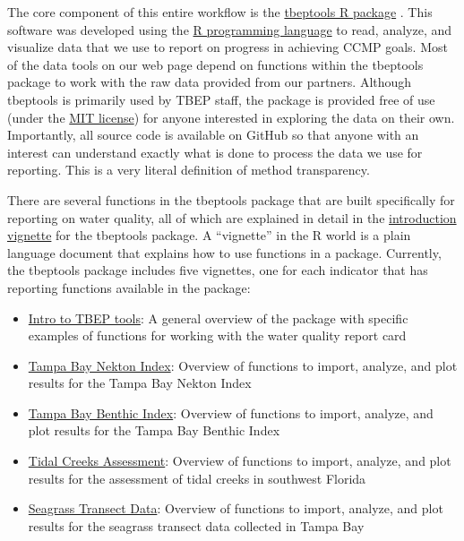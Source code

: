 \documentclass[
]{book}
\providecommand{\tightlist}{%
  \setlength{\itemsep}{0pt}\setlength{\parskip}{0pt}}
\begin{document}
The core component of this entire workflow is the \href{https://tbep-tech.github.io/tbeptools/}{tbeptools R package} \citep{Beck21}. This software was developed using the \href{https://cran.r-project.org/}{R programming language} to read, analyze, and visualize data that we use to report on progress in achieving CCMP goals. Most of the data tools on our web page depend on functions within the tbeptools package to work with the raw data provided from our partners. Although tbeptools is primarily used by TBEP staff, the package is provided free of use (under the \href{https://tldrlegal.com/license/mit-license}{MIT license}) for anyone interested in exploring the data on their own. Importantly, all source code is available on GitHub so that anyone with an interest can understand exactly what is done to process the data we use for reporting. This is a very literal definition of method transparency.

There are several functions in the tbeptools package that are built specifically for reporting on water quality, all of which are explained in detail in the \href{https://tbep-tech.github.io/tbeptools/articles/intro.html}{introduction vignette} for the tbeptools package. A ``vignette'' in the R world is a plain language document that explains how to use functions in a package. Currently, the tbeptools package includes five vignettes, one for each indicator that has reporting functions available in the package:

\begin{itemize}
\tightlist
\item
  \href{https://tbep-tech.github.io/tbeptools/articles/intro.html}{Intro to TBEP tools}: A general overview of the package with specific examples of functions for working with the water quality report card
\item
  \href{https://tbep-tech.github.io/tbeptools/articles/tbni.html}{Tampa Bay Nekton Index}: Overview of functions to import, analyze, and plot results for the Tampa Bay Nekton Index
\item
  \href{https://tbep-tech.github.io/tbeptools/articles/tbbi.html}{Tampa Bay Benthic Index}: Overview of functions to import, analyze, and plot results for the Tampa Bay Benthic Index
\item
  \href{https://tbep-tech.github.io/tbeptools/articles/tidalcreeks.html}{Tidal Creeks Assessment}: Overview of functions to import, analyze, and plot results for the assessment of tidal creeks in southwest Florida
\item
  \href{https://tbep-tech.github.io/tbeptools/articles/seagrasstransect.html}{Seagrass Transect Data}: Overview of functions to import, analyze, and plot results for the seagrass transect data collected in Tampa Bay
\end{itemize}
\end{document}
